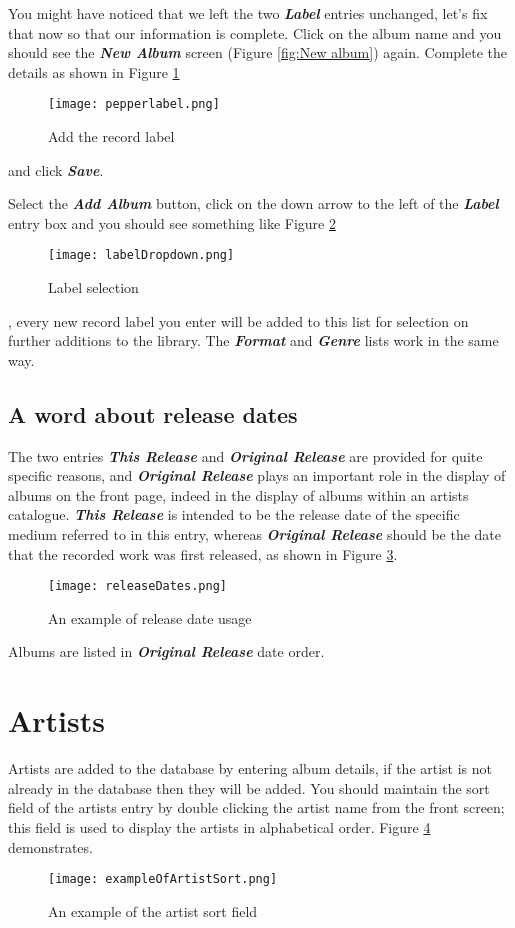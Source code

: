 You might have noticed that we left the two
\textit{\textbf{Label}}
entries unchanged, let's fix that now so that our information is complete.  Click on the album name and you should see the
\textit{\textbf{New Album}}
screen (Figure 
\ref{fig:New album})
again.  Complete the details as shown in Figure
\ref{fig:Add the record label}
\begin{figure}[!ht]
 \texttt{[image: pepperlabel.png]}
 \caption{Add the record label}
 \label{fig:Add the record label}
\end{figure}
and click 
\textbf{\textit{Save}}.

\newpage
Select the 
\textit{\textbf{Add Album}}
button, click on the down arrow to the left of the
\textit{\textbf{Label}}
entry box and you should see something like Figure
\ref{fig:Label selection}
\begin{figure}[!ht]
 \texttt{[image: labelDropdown.png]}
 \caption{Label selection}
 \label{fig:Label selection}
\end{figure} 
, every new record label you enter will be added to this list for selection on further additions to the library.  The
\textbf{\textit{Format}} and
\textbf{\textit{Genre}}
lists work in the same way.

\subsection{A word about release dates}
The two entries
\textbf{\textit{This Release}} and
\textbf{\textit{Original Release}}
are provided for quite specific reasons, and
\textbf{\textit{Original Release}}
plays an important role in the display of albums on the front page, indeed in the display of albums within an artists catalogue.
\textbf{\textit{This Release}}
is intended to be the release date of the specific medium referred to in this entry, whereas
\textbf{\textit{Original Release}}
should be the date that the recorded work was first released, as shown in Figure
\ref{fig:releaseDates}.
\begin{figure}[!ht]
 \texttt{[image: releaseDates.png]}
 \caption{An example of release date usage}
 \label{fig:releaseDates}
\end{figure} 

Albums are listed in
\textbf{\textit{Original Release}}
date order.

\newpage
\section{Artists}
\label{sect:artists}
Artists are added to the database by entering album details, if the artist is not already in the database then they will be added.  You should maintain the sort field of the artists entry by double clicking the artist name from the front screen; this field is used to display the artists in alphabetical order. Figure
\ref{fig:exampleOfArtistSort} demonstrates.
\begin{figure}[!ht]
 \texttt{[image: exampleOfArtistSort.png]}
 \caption{An example of the artist sort field}
 \label{fig:exampleOfArtistSort}
\end{figure} 

